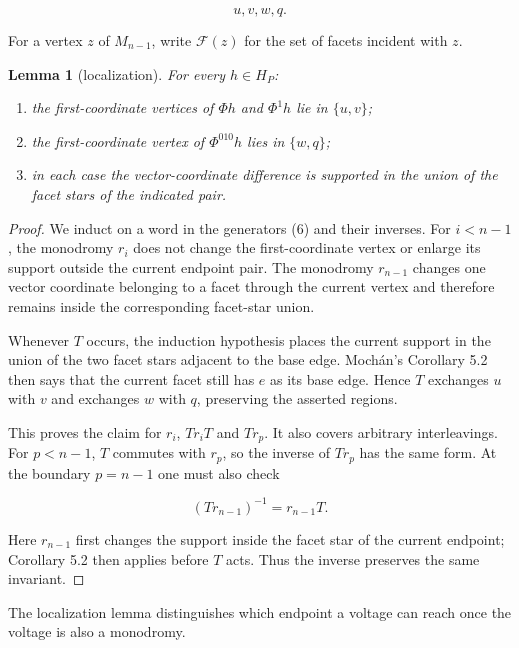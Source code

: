 \documentclass[11pt]{article}
\newtheorem{lemma}[theorem]{Lemma}
\begin{document}
\[
u,v,w,q.
\]

For a vertex $z$ of $M_{n-1}$, write $\mathcal F(z)$ for the set of facets incident with $z$.

\begin{lemma}[localization]

For every $h\in H_P$:

\begin{enumerate}
\item the first-coordinate vertices of $\Phi h$ and $\Phi^1h$ lie in $\{u,v\}$;
\item the first-coordinate vertex of $\Phi^{010}h$ lies in $\{w,q\}$;
\item in each case the vector-coordinate difference is supported in the union of the facet stars of
the indicated pair.
\end{enumerate}

\end{lemma}

\begin{proof}

We induct on a word in the generators (6) and their inverses. For $i<n-1$, the monodromy $r_i$
does not change the first-coordinate vertex or enlarge its support outside the current endpoint
pair. The monodromy $r_{n-1}$ changes one vector coordinate belonging to a facet through the current
vertex and therefore remains inside the corresponding facet-star union.

Whenever $T$ occurs, the induction hypothesis places the current support in the union of the two
facet stars adjacent to the base edge. Mochán's Corollary 5.2 then says that the current facet still
has $e$ as its base edge. Hence $T$ exchanges $u$ with $v$ and exchanges $w$ with $q$, preserving
the asserted regions.

This proves the claim for $r_i$, $Tr_iT$ and $Tr_p$. It also covers arbitrary interleavings. For
$p<n-1$, $T$ commutes with $r_p$, so the inverse of $Tr_p$ has the same form. At the boundary
$p=n-1$ one must also check

\[
(Tr_{n-1})^{-1}=r_{n-1}T.
\]

Here $r_{n-1}$ first changes the support inside the facet star of the current endpoint; Corollary 5.2
then applies before $T$ acts. Thus the inverse preserves the same invariant.
\end{proof}

The localization lemma distinguishes which endpoint a voltage can reach once the voltage is also a
monodromy.
\end{document}
